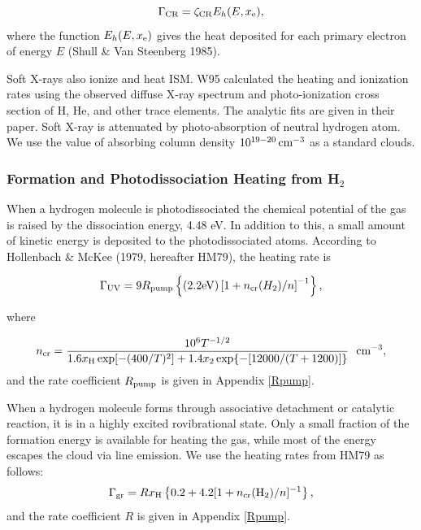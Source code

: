 \begin{equation}
\Gamma_{\rm CR}=\zeta_{\rm CR}E_h(E,x_{\rm e}),
\end{equation}
where the function $E_h(E,x_{\rm e})$ gives the
heat deposited for each primary electron of energy $E$
(Shull \& Van Steenberg 1985).

Soft X-rays also ionize and heat ISM.
W95 calculated the heating and ionization rates using 
the observed diffuse X-ray spectrum and photo-ionization cross section of
H, He, and other trace elements.
The analytic fits are given in their paper.
Soft X-ray is attenuated by photo-absorption of neutral hydrogen atom.
We use the value of absorbing column density 
$10^{19-20}\,{\rm cm^{-3}}$ as a standard  clouds.

\subsubsection{Formation and Photodissociation Heating from H$_2$}
When a hydrogen molecule is photodissociated the chemical potential of the gas
is raised by the dissociation energy, 4.48 eV.
In addition to this, a small amount of kinetic energy
is deposited to the photodissociated atoms.
According to Hollenbach \& McKee (1979, hereafter HM79),
the heating rate is

\begin{equation}
\Gamma_{\rm UV}=9 R_{\rm pump}
\left\{(2.2{\rm eV})\left[1+n_{\rm cr}(H_2)/n\right]^{-1}\right\},
\end{equation}

where 

\begin{equation}
n_{\rm cr}=\frac{10^6T^{-1/2}}{1.6x_{\rm H}\exp[-(400/T)^2]
+1.4x_2\exp \{-[12000/(T+1200)]\}} \ \ {\rm cm^{-3}},
\end{equation}
and the rate coefficient $R_{\rm pump}$ is given in 
Appendix \ref{Rpump}.

When a hydrogen molecule forms through associative detachment
or catalytic reaction,
it is in a highly excited rovibrational state.
Only a small fraction of the formation energy is
available for heating the gas, while most of the energy escapes the cloud
via line emission.
We use the heating rates from HM79
as follows:
\begin{equation}
\Gamma_{\rm gr}=Rx_{\rm H}
\left\{0.2+4.2[1+n_{\rm cr}({\rm H_2})/n]^{-1}\right\},
\end{equation}
and the rate coefficient $R$ is given in Appendix \ref{Rpump}.

